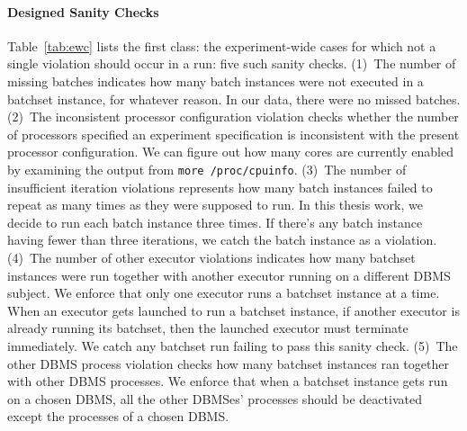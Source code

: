 \paragraph{Designed Sanity Checks} 

Table~\ref{tab:ewc} lists the first class: the experiment-wide cases 
for which not a single violation should occur in a run: five such sanity checks. 
%
(1)~The number of missing batches indicates how many batch instances 
were not executed in a batchset instance, for whatever reason. 
In our data, there were no missed batches.
%
(2)~The inconsistent processor configuration violation checks whether 
the number of processors specified an experiment specification is inconsistent 
with the present processor configuration. 
%
We can figure out how many cores are currently enabled by examining the output from {\tt more /proc/cpuinfo}.
(3)~The number of insufficient iteration violations represents how many batch instances 
failed to repeat as many times as they were supposed to run.
In this thesis work, we decide to run each batch instance three times. 
If there's any batch instance having fewer than three iterations, 
we catch the batch instance as a violation. 
(4)~The number of other executor violations indicates how many batchset instances
were run together with another executor running on a different DBMS subject. 
We enforce that only one executor runs a batchset instance at a time. 
When an executor gets launched to run a batchset instance, 
if another executor is already running its batchset, then the launched executor must terminate immediately. 
We catch any batchset run failing to pass this sanity check.
(5)~The other DBMS process violation checks how 
many batchset instances ran together with other \hbox{DBMS} processes. 
We enforce that when a batchset instance gets run on a chosen \hbox{DBMS}, 
all the other \hbox{DBMSes}' processes should be deactivated except the processes 
of a chosen \hbox{DBMS}.

